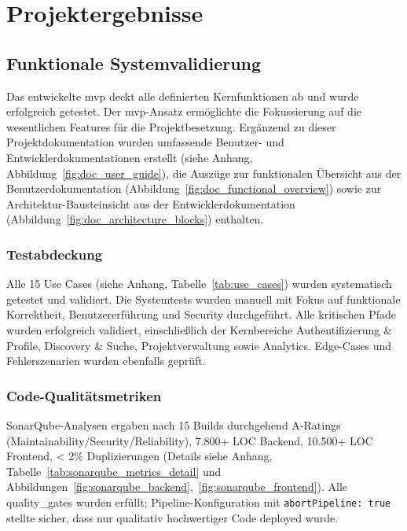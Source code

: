 \chapter{Projektergebnisse}

\section{Funktionale Systemvalidierung}

Das entwickelte \gls{mvp} deckt alle definierten Kernfunktionen ab und wurde erfolgreich getestet. Der \gls{mvp}-Ansatz ermöglichte die Fokussierung auf die wesentlichen Features für die Projektbesetzung. Ergänzend zu dieser Projektdokumentation wurden umfassende Benutzer- und Entwicklerdokumentationen erstellt (siehe Anhang, Abbildung~\ref{fig:doc_user_guide}), die Auszüge zur funktionalen Übersicht aus der Benutzerdokumentation (Abbildung~\ref{fig:doc_functional_overview}) sowie zur Architektur-Bausteinsicht aus der Entwicklerdokumentation (Abbildung~\ref{fig:doc_architecture_blocks}) enthalten.

\subsection{Testabdeckung}

Alle 15 Use Cases (siehe Anhang, Tabelle~\ref{tab:use_cases}) wurden systematisch getestet und validiert. Die Systemtests wurden manuell mit Fokus auf funktionale Korrektheit, Benutzererführung und Security durchgeführt. Alle kritischen Pfade wurden erfolgreich validiert, einschließlich der Kernbereiche Authentifizierung \& Profile, Discovery \& Suche, Projektverwaltung sowie Analytics. Edge-Cases und Fehlerszenarien wurden ebenfalls geprüft.

\subsection{Code-Qualitätsmetriken}

SonarQube\cite{sonarqube_docs}-Analysen ergaben nach 15 Builds durchgehend A-Ratings (Maintainability/Security/Reliability), 7.800+ LOC Backend, 10.500+ LOC Frontend, < 2\% Duplizierungen (Details siehe Anhang, Tabelle~\ref{tab:sonarqube_metrics_detail} und Abbildungen~\ref{fig:sonarqube_backend},~\ref{fig:sonarqube_frontend}). Alle \glspl{quality_gate} wurden erfüllt; Pipeline-Konfiguration mit \texttt{abortPipeline: true} stellte sicher, dass nur qualitativ hochwertiger Code deployed wurde.


